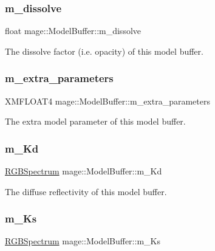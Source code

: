 \subsubsection{\texorpdfstring{m\+\_\+dissolve}{m\_dissolve}}
{\footnotesize\ttfamily float mage\+::\+Model\+Buffer\+::m\+\_\+dissolve}

The dissolve factor (i.\+e. opacity) of this model buffer. \hypertarget{structmage_1_1_model_buffer_a0daee7daeca6c86f029b8fa41c6d7866}{}\label{structmage_1_1_model_buffer_a0daee7daeca6c86f029b8fa41c6d7866} 
\subsubsection{\texorpdfstring{m\+\_\+extra\+\_\+parameters}{m\_extra\_parameters}}
{\footnotesize\ttfamily X\+M\+F\+L\+O\+A\+T4 mage\+::\+Model\+Buffer\+::m\+\_\+extra\+\_\+parameters}

The extra model parameter of this model buffer. \hypertarget{structmage_1_1_model_buffer_a3a0212d49721bc44c28f9ba1fbe38e1e}{}\label{structmage_1_1_model_buffer_a3a0212d49721bc44c28f9ba1fbe38e1e} 
\subsubsection{\texorpdfstring{m\+\_\+\+Kd}{m\_Kd}}
{\footnotesize\ttfamily \hyperlink{structmage_1_1_r_g_b_spectrum}{R\+G\+B\+Spectrum} mage\+::\+Model\+Buffer\+::m\+\_\+\+Kd}

The diffuse reflectivity of this model buffer. \hypertarget{structmage_1_1_model_buffer_a0f1c0dc40a4252b4a79bd2d9c30b3fca}{}\label{structmage_1_1_model_buffer_a0f1c0dc40a4252b4a79bd2d9c30b3fca} 
\subsubsection{\texorpdfstring{m\+\_\+\+Ks}{m\_Ks}}
{\footnotesize\ttfamily \hyperlink{structmage_1_1_r_g_b_spectrum}{R\+G\+B\+Spectrum} mage\+::\+Model\+Buffer\+::m\+\_\+\+Ks}

